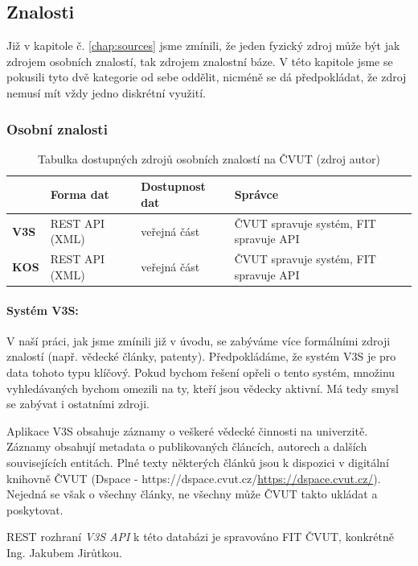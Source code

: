 \subsection{Znalosti}
Již v kapitole č. \ref{chap:sources} jsme zmínili, že jeden fyzický zdroj může být jak zdrojem osobních znalostí, tak zdrojem znalostní báze. V této kapitole jsme se pokusili tyto dvě kategorie od sebe oddělit, nicméně se dá předpokládat, že zdroj nemusí mít vždy jedno diskrétní využití.
\subsubsection{Osobní znalosti}
\begin{table}[h!]
\begin{ctucolortab}
\begin{tabularx}{0.95\linewidth}{l|X|X|X}
\bfseries  & \bfseries Forma dat & \bfseries Dostupnost dat  & \bfseries Správce\\\hline 
    \textbf{V3S} & REST API (XML) & veřejná část & ČVUT spravuje systém, FIT spravuje API \\ \hline
    \textbf{KOS} & REST API (XML) & veřejná část & ČVUT spravuje systém, FIT spravuje API
\end{tabularx}
\end{ctucolortab}
	\caption{Tabulka dostupných zdrojů osobních znalostí na ČVUT (zdroj autor)}
	\label{tab:data-sources-people-fel}
\end{table}
\paragraph{Systém V3S:} V naší práci, jak jsme zmínili již v úvodu, se zabýváme více formálními zdroji znalostí (např. vědecké články, patenty). Předpokládáme, že systém V3S je pro data tohoto typu klíčový. Pokud bychom řešení opřeli o tento systém, množinu vyhledávaných bychom omezili na ty, kteří jsou vědecky aktivní. Má tedy smysl se zabývat i ostatními zdroji.\par
Aplikace V3S obsahuje záznamy o veškeré vědecké činnosti na univerzitě. Záznamy obsahují metadata o publikovaných článcích, autorech a dalších souvisejících entitách. Plné texty některých článků jsou k dispozici v digitální knihovně ČVUT (Dspace - https://dspace.cvut.cz/\url{https://dspace.cvut.cz/}). Nejedná se však o všechny články, ne všechny může ČVUT takto ukládat a poskytovat.\par
\noindent REST rozhraní \textit{V3S API} k této databázi je spravováno FIT ČVUT, konkrétně Ing. Jakubem Jirůtkou.\par
